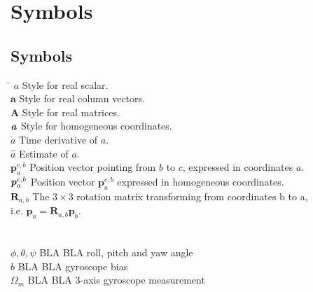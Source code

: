 \chapter*{Symbols}
\label{sec:symbols}

\section*{Symbols}

\begin{tabbing}
 \hspace*{3cm} \= \kill
  $a$                     \> Style for real scalar. \\[0.5ex]
  $\textbf{a}$            \> Style for real column vectors. \\[0.5ex]
  $\textbf{A}$            \> Style for real matrices. \\[0.5ex]
  $\textbf{\textit{a}}$   \> Style for homogeneous coordinates. \\[0.5ex]
  $\dot{a}$               \> Time derivative of $a$. \\[0.5ex]
  $\hat{a}$               \> Estimate of $a$. \\[0.5ex]
  $\textbf{p}^{c,b}_a$    \> Position vector pointing from $b$ to $c$, expressed in coordinates $a$. \\[0.5ex]
  $\textbf{\textit{p}}^{c,b}_a$    \> Position vector $\textbf{p}^{c,b}_a$ expressed in homogeneous coordinates. \\[0.5ex]
  $\textbf{R}_{a,b}$      \> The $3\times3$ rotation matrix transforming from coordinates b to a, \\ \> i.e. $\textbf{p}_a=\textbf{R}_{a,b}\textbf{p}_b$. \\[0.5ex]
  
  \\
  \\
  $\phi, \theta, \psi$    \> BLA BLA roll, pitch and yaw angle \\[0.5ex]
  $b$                     \> BLA BLA gyroscope bias \\[0.5ex]										
  $\Omega_m$              \> BLA BLA 3-axis gyroscope measurement \\[0.5ex]   		
\end{tabbing}

